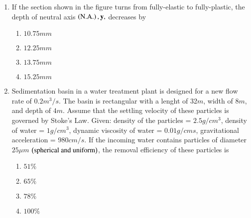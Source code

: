 \documentclass[journal,12pt,onecolumn]{IEEEtran}
\theoremstyle{remark}
\begin{document}
\begin{enumerate}
    \item If the section shown in the figure turns from fully-elastic to fully-plastic, the depth of 
        neutral axis $\left(\text{N.A.}\right), \mathbf{y},$ decreases by 
\begin{center}
            \resizebox{0.3\textwidth}{!}{
                
            } 
        \end{center}
        \hfill{}
 \begin{multicols}{4}
            \begin{enumerate}
                \item $10.75mm$
                    \columnbreak
                \item $12.25mm$
                    \columnbreak
                \item $13.75mm$
                    \columnbreak
                \item $15.25mm$
            \end{enumerate}
        \end{multicols}

    \item Sedimentation basin in a water treatment plant is designed for a new flow rate of $0.2m^3/s$.
        The basin is rectangular with a lenght of 32$m$, width of $8m$, and depth of $4m$. Assume that the
        settling velocity of these particles is governed by Stoke's Law. Given: density of the particles = 
        $2.5g/cm^3$, density of water = $1 g/cm^3$, dynamic viscosity of water = $0.01 g/cm s$, gravitational
        acceleration = $980 cm/s$. If the incoming water contains particles of diameter $25 \mu m$ 
        $\left(\text{spherical and uniform}\right)$, the removal efficiency of these particles is
        \hfill{}
     \begin{multicols}{4}
            \begin{enumerate}
                \item $51\%$
                    \columnbreak
                \item $65\%$
                    \columnbreak
                \item $78\%$
                    \columnbreak
                \item $100\%$
            \end{enumerate}
        \end{multicols}


\end{enumerate}
\end{document}
